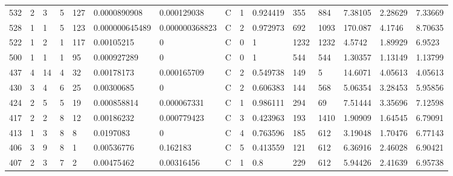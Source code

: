 \begin{latin}
\begin{longtable}{lllllllllllllll}
	532 & 2  & 3   & 5  & 127 & 0.0000890908   & 0.000129038    & C & 1  & 0.924419 & 355  & 884  & 7.38105 & 2.28629 & 7.33669 \\
	528 & 1  & 1   & 5  & 123 & 0.000000645489 & 0.000000368823 & C & 2  & 0.972973 & 692  & 1093 & 170.087 & 4.1746  & 8.70635 \\
	522 & 1  & 2   & 1  & 117 & 0.00105215     & 0              & C & 0  & 1        & 1232 & 1232 & 4.5742  & 1.89929 & 6.9523  \\
	500 & 1  & 1   & 1  & 95  & 0.000927289    & 0              & C & 0  & 1        & 544  & 544  & 1.30357 & 1.13149 & 1.13799 \\
	437 & 4  & 14  & 4  & 32  & 0.00178173     & 0.000165709    & C & 2  & 0.549738 & 149  & 5    & 14.6071 & 4.05613 & 4.05613 \\
	430 & 3  & 4   & 6  & 25  & 0.00300685     & 0              & C & 2  & 0.606383 & 144  & 568  & 5.06354 & 3.28453 & 5.95856 \\
	424 & 2  & 5   & 5  & 19  & 0.000858814    & 0.000067331    & C & 1  & 0.986111 & 294  & 69   & 7.51444 & 3.35696 & 7.12598 \\
	417 & 2  & 2   & 8  & 12  & 0.00186232     & 0.000779423    & C & 3  & 0.423963 & 193  & 1410 & 1.90909 & 1.64545 & 6.79091 \\
	413 & 1  & 3   & 8  & 8   & 0.0197083      & 0              & C & 4  & 0.763596 & 185  & 612  & 3.19048 & 1.70476 & 6.77143 \\
	406 & 3  & 9   & 8  & 1   & 0.00536776     & 0.162183       & C & 5  & 0.413559 & 121  & 612  & 6.36916 & 2.46028 & 6.90421 \\
	407 & 2  & 3   & 7  & 2   & 0.00475462     & 0.00316456     & C & 1  & 0.8      & 229  & 612  & 5.94426 & 2.41639 & 6.95738
	
\end{longtable}
\end{latin}


